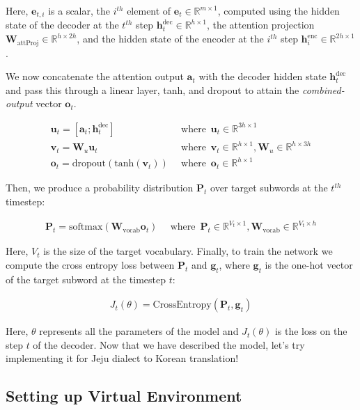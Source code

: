 \documentclass{assignment format}
\newcommand{\Real}{\mathbb{R}}
\newcommand{\henc}{\mathbf{h}^{\text{enc}}}
\newcommand{\hdec}{\mathbf{h}^{\text{dec}}}
\begin{document}
Here, $\mathbf{e}_{t, i}$ is a scalar, the $i^{th}$ element of $\mathbf{e}_{t} \in \Real^{m \times 1}$, computed using the hidden state of the decoder at the $t^{th}$ step $\hdec_t \in \Real^{h \times 1}$, the attention projection $\mathbf{W}_{\text{attProj}} \in \Real^{h \times 2h}$, and the hidden state of the encoder at the $i^{th}$ step $\henc_i \in \Real^{2h \times 1}$.

We now concatenate the attention output $\mathbf{a}_t$ with the decoder hidden state $\hdec_t$ and pass this through a linear layer, tanh, and dropout to attain the \textit{combined-output} vector $\mathbf{o}_{t}$.

\begin{align}   
    \mathbf{u}_{t} = [\mathbf{a}_{t}; \hdec_t] \enspace &\text{where} \enspace \mathbf{u}_t \in  \Real^{3h \times 1} \\
    \mathbf{v}_t = \mathbf{W}_{u}\mathbf{u}_t \enspace &\text{where} \enspace \mathbf{v}_t \in \Real^{h \times 1}, \mathbf{W}_{u} \in \Real^{h \times 3h}\\
    \mathbf{o}_t = \text{dropout}(\text{tanh}(\mathbf{v}_t)) \enspace &\text{where} \enspace \mathbf{o}_t \in \Real^{h \times 1}
\end{align}

Then, we produce a probability distribution $\mathbf{P}_t$ over target subwords at the $t^{th}$ timestep:

\begin{align}
    \mathbf{P}_t = \text{softmax}(\mathbf{W}_{\text{vocab}}\mathbf{o}_{t}) \enspace &\text{where} \enspace \mathbf{P}_t \in \Real^{V_{t} \times 1}, \mathbf{W}_{\text{vocab}} \in \Real^{V_{t} \times h}
\end{align}

Here, $V_{t}$ is the size of the target vocabulary. Finally, to train the network we compute the cross entropy loss between $\mathbf{P}_t$ and $\mathbf{g}_{t}$, where $\mathbf{g}_{t}$ is the one-hot vector of the target subword at the timestep $t$:

\begin{align}
    J_t(\theta) = \mathrm{CrossEntropy}(\mathbf{P}_t,\mathbf{g}_{t})
\end{align}

Here, $\theta$ represents all the parameters of the model and $J_t(\theta)$ is the loss on the step $t$ of the decoder.
Now that we have described the model, let's try implementing it for Jeju dialect to Korean translation!

\subsection{Setting up Virtual Environment}
\end{document}
